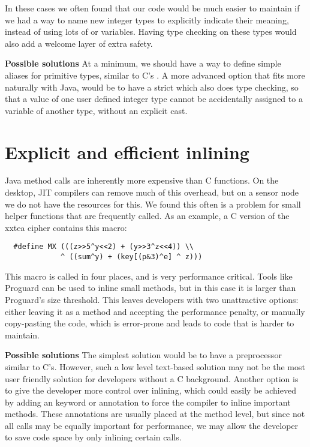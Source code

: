 In these cases we often found that our code would be much easier to maintain if we had a way to name new integer types to explicitly indicate their meaning, instead of using lots of  or  variables. Having type checking on these types would also add a welcome layer of extra safety.

\textbf{Possible solutions}
At a minimum, we should have a way to define simple aliases for primitive types, similar to C's . A more advanced option that fits more naturally with Java, would be to have a strict  which also does type checking, so that a value of one user defined integer type cannot be accidentally assigned to a variable of another type, without an explicit cast.



\section{Explicit and efficient inlining}
\label{sec-inlining}
Java method calls are inherently more expensive than C functions. On the desktop, JIT compilers can remove much of this overhead, but on a sensor node we do not have the resources for this. We found this often is a problem for small helper functions that are frequently called. As an example, a C version of the xxtea cipher \cite{Wheeler:1998} contains this macro: 
\begin{verbatim}
  #define MX (((z>>5^y<<2) + (y>>3^z<<4)) \\
             ^ ((sum^y) + (key[(p&3)^e] ^ z)))
\end{verbatim}

This macro is called in four places, and is very performance critical. Tools like Proguard \cite{proguard} can be used to inline small methods, but in this case it is larger than Proguard's size threshold. This leaves developers with two unattractive options: either leaving it as a method and accepting the performance penalty, or manually copy-pasting the code, which is error-prone and leads to code that is harder to maintain.

\textbf{Possible solutions}
The simplest solution would be to have a preprocessor similar to C's. However, such a low level text-based solution may not be the most user friendly solution for developers without a C background.
Another option is to give the developer more control over inlining, which could easily be achieved by adding an  keyword or annotation to force the compiler to inline important methods. These annotations are usually placed at the method level, but since not all calls may be equally important for performance, we may allow the developer to save code space by only inlining certain calls.



